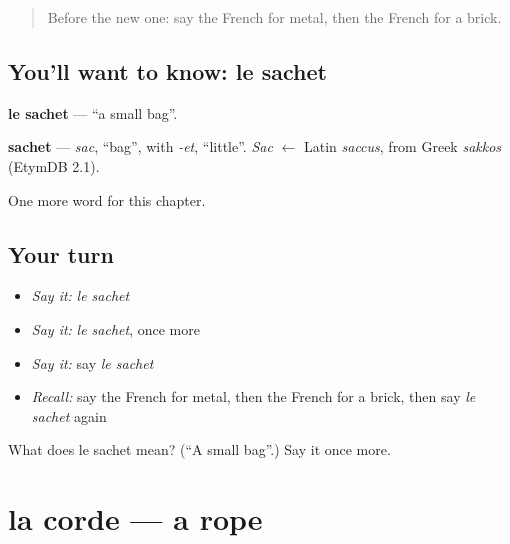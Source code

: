 \label{lesson:FR-C202-sachet}



\begin{quote}
Before the new one: say the French for metal, then the French for a brick.
\end{quote}

\subsection*{You'll want to know: le sachet}
\textbf{le sachet} — \textquotedblleft{}a small bag\textquotedblright{}.

\begin{cousinweb}
\textbf{sachet} — \emph{sac}, \textquotedblleft{}bag\textquotedblright{}, with \emph{-et}, \textquotedblleft{}little\textquotedblright{}. \emph{Sac} $\leftarrow$ Latin \emph{saccus}, from Greek \emph{sakkos} (EtymDB 2.1).
\end{cousinweb}

\begin{grammarlens}[title={What you've built}]
One more word for this chapter.
\end{grammarlens}

\subsection*{Your turn}
\begin{itemize}
\raggedright
  \item \emph{Say it:} \emph{le sachet}
  \item \emph{Say it:} \emph{le sachet}, once more
  \item \emph{Say it:} say \emph{le sachet}
  \item \emph{Recall:} say the French for metal, then the French for a brick, then say \emph{le sachet} again
\end{itemize}

\begin{tcolorbox}[breakable,colback=teal!4,colframe=teal!35!black,title={Before you move on}]
What does le sachet mean? (\textquotedblleft{}A small bag\textquotedblright{}.) Say it once more.
\end{tcolorbox}
\section[la corde]{la corde — a rope}

\label{lesson:FR-C202-corde}




